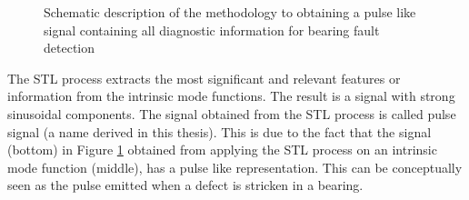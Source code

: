 \documentclass[../Main/thesis.tex]{subfiles}
\begin{document}
%
\begin{figure}[H]
  \caption{Schematic description of the methodology to obtaining a pulse like signal containing all diagnostic information for bearing fault detection}
   \label{fig:pulse}
\end{figure}
\justify
The STL process extracts the most significant and relevant features or information from the intrinsic mode functions. The result is a signal with strong sinusoidal components. The signal obtained from the STL process is called pulse signal (a name derived in this thesis). This is due to the fact that the signal (bottom) in Figure \ref{fig:pulse} obtained from applying the STL process on an intrinsic mode function (middle), has a pulse like representation. This can be conceptually seen as the pulse emitted when a defect is stricken in a bearing. 
\end{document}
